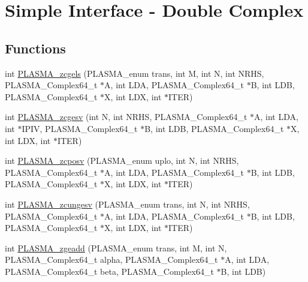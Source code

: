 \hypertarget{group__PLASMA__Complex64__t}{}\section{Simple Interface -\/ Double Complex}
\label{group__PLASMA__Complex64__t}
\subsection*{Functions}
\begin{DoxyCompactItemize}
\item 
int \hyperlink{group__PLASMA__Complex64__t_ga6733ad2b79f186348ba47778e2e26fae_ga6733ad2b79f186348ba47778e2e26fae}{P\+L\+A\+S\+M\+A\+\_\+zcgels} (P\+L\+A\+S\+M\+A\+\_\+enum trans, int M, int N, int N\+R\+H\+S, P\+L\+A\+S\+M\+A\+\_\+\+Complex64\+\_\+t $\ast$A, int L\+D\+A, P\+L\+A\+S\+M\+A\+\_\+\+Complex64\+\_\+t $\ast$B, int L\+D\+B, P\+L\+A\+S\+M\+A\+\_\+\+Complex64\+\_\+t $\ast$X, int L\+D\+X, int $\ast$I\+T\+E\+R)
\item 
int \hyperlink{group__PLASMA__Complex64__t_gab372ccb64517ddb8e0f7ea66088489a9_gab372ccb64517ddb8e0f7ea66088489a9}{P\+L\+A\+S\+M\+A\+\_\+zcgesv} (int N, int N\+R\+H\+S, P\+L\+A\+S\+M\+A\+\_\+\+Complex64\+\_\+t $\ast$A, int L\+D\+A, int $\ast$I\+P\+I\+V, P\+L\+A\+S\+M\+A\+\_\+\+Complex64\+\_\+t $\ast$B, int L\+D\+B, P\+L\+A\+S\+M\+A\+\_\+\+Complex64\+\_\+t $\ast$X, int L\+D\+X, int $\ast$I\+T\+E\+R)
\item 
int \hyperlink{group__PLASMA__Complex64__t_ga11ee4c71901e8675d5423cfceecaaf43_ga11ee4c71901e8675d5423cfceecaaf43}{P\+L\+A\+S\+M\+A\+\_\+zcposv} (P\+L\+A\+S\+M\+A\+\_\+enum uplo, int N, int N\+R\+H\+S, P\+L\+A\+S\+M\+A\+\_\+\+Complex64\+\_\+t $\ast$A, int L\+D\+A, P\+L\+A\+S\+M\+A\+\_\+\+Complex64\+\_\+t $\ast$B, int L\+D\+B, P\+L\+A\+S\+M\+A\+\_\+\+Complex64\+\_\+t $\ast$X, int L\+D\+X, int $\ast$I\+T\+E\+R)
\item 
int \hyperlink{group__PLASMA__Complex64__t_gaba15b4f438d8d2fe41f2c38820d043ef_gaba15b4f438d8d2fe41f2c38820d043ef}{P\+L\+A\+S\+M\+A\+\_\+zcungesv} (P\+L\+A\+S\+M\+A\+\_\+enum trans, int N, int N\+R\+H\+S, P\+L\+A\+S\+M\+A\+\_\+\+Complex64\+\_\+t $\ast$A, int L\+D\+A, P\+L\+A\+S\+M\+A\+\_\+\+Complex64\+\_\+t $\ast$B, int L\+D\+B, P\+L\+A\+S\+M\+A\+\_\+\+Complex64\+\_\+t $\ast$X, int L\+D\+X, int $\ast$I\+T\+E\+R)
\item 
int \hyperlink{group__PLASMA__Complex64__t_gacfd25c8398bf6b58526f7937e649bbce_gacfd25c8398bf6b58526f7937e649bbce}{P\+L\+A\+S\+M\+A\+\_\+zgeadd} (P\+L\+A\+S\+M\+A\+\_\+enum trans, int M, int N, P\+L\+A\+S\+M\+A\+\_\+\+Complex64\+\_\+t alpha, P\+L\+A\+S\+M\+A\+\_\+\+Complex64\+\_\+t $\ast$A, int L\+D\+A, P\+L\+A\+S\+M\+A\+\_\+\+Complex64\+\_\+t beta, P\+L\+A\+S\+M\+A\+\_\+\+Complex64\+\_\+t $\ast$B, int L\+D\+B)

\end{DoxyCompactItemize}
